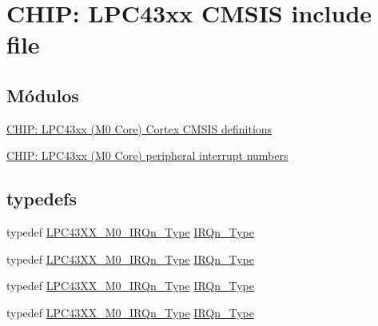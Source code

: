 \hypertarget{group___c_m_s_i_s__43_x_x___m0}{}\section{C\+H\+IP\+: L\+P\+C43xx C\+M\+S\+IS include file}
\label{group___c_m_s_i_s__43_x_x___m0}
\subsection*{Módulos}
\begin{DoxyCompactItemize}
\item 
\hyperlink{group___c_m_s_i_s__43_x_x___m0___c_o_m_m_o_n}{C\+H\+I\+P\+: L\+P\+C43xx (\+M0 Core) Cortex C\+M\+S\+I\+S definitions}
\item 
\hyperlink{group___c_m_s_i_s__43_x_x___m0___i_r_q}{C\+H\+I\+P\+: L\+P\+C43xx (\+M0 Core) peripheral interrupt numbers}
\end{DoxyCompactItemize}
\subsection*{\textquotesingle{}typedefs\textquotesingle{}}
\begin{DoxyCompactItemize}
\item 
typedef \hyperlink{group___c_m_s_i_s__43_x_x___m0___i_r_q_ga402456eb2f4f5b3dc2a53f725eed9485}{L\+P\+C43\+X\+X\+\_\+\+M0\+\_\+\+I\+R\+Qn\+\_\+\+Type} \hyperlink{group___c_m_s_i_s__43_x_x___m0_gaf9da996d1de1fbce33c325fc3c4292da}{I\+R\+Qn\+\_\+\+Type}
\item 
typedef \hyperlink{group___c_m_s_i_s__43_x_x___m0___i_r_q_ga402456eb2f4f5b3dc2a53f725eed9485}{L\+P\+C43\+X\+X\+\_\+\+M0\+\_\+\+I\+R\+Qn\+\_\+\+Type} \hyperlink{group___c_m_s_i_s__43_x_x___m0_gaf9da996d1de1fbce33c325fc3c4292da}{I\+R\+Qn\+\_\+\+Type}
\item 
typedef \hyperlink{group___c_m_s_i_s__43_x_x___m0___i_r_q_ga402456eb2f4f5b3dc2a53f725eed9485}{L\+P\+C43\+X\+X\+\_\+\+M0\+\_\+\+I\+R\+Qn\+\_\+\+Type} \hyperlink{group___c_m_s_i_s__43_x_x___m0_gaf9da996d1de1fbce33c325fc3c4292da}{I\+R\+Qn\+\_\+\+Type}
\item 
typedef \hyperlink{group___c_m_s_i_s__43_x_x___m0___i_r_q_ga402456eb2f4f5b3dc2a53f725eed9485}{L\+P\+C43\+X\+X\+\_\+\+M0\+\_\+\+I\+R\+Qn\+\_\+\+Type} \hyperlink{group___c_m_s_i_s__43_x_x___m0_gaf9da996d1de1fbce33c325fc3c4292da}{I\+R\+Qn\+\_\+\+Type}
\end{DoxyCompactItemize}



